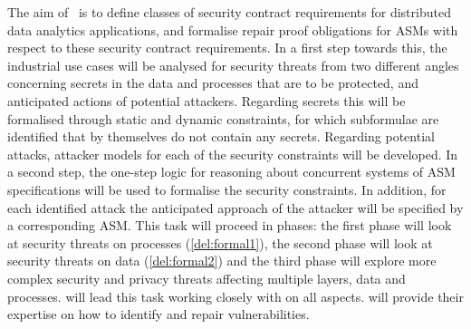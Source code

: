 \begin{Workpackage}{\thewpno}
\begin{Task}
\TaskResults{%
\ref{del:formal1},
\ref{del:formal2},
\ref{del:formal3}
}
\TaskHeader{}

The aim of \theTask\ is to define classes of security contract requirements for distributed data analytics applications, and formalise repair proof obligations for ASMs with respect to these security contract requirements. In a first step towards this, the industrial use cases will be analysed for security threats from two different angles concerning secrets in the data and processes that are to be protected, and anticipated actions of potential attackers. Regarding secrets this will be formalised through static and dynamic constraints, for which subformulae are identified that by themselves do not contain any secrets. Regarding potential attacks, attacker models for each of the security constraints will be developed. In a second step, the one-step logic for reasoning about concurrent systems of ASM specifications will be used to formalise the security constraints. In addition, for each identified attack the anticipated approach of the attacker will be specified by a corresponding ASM. This task will proceed in phases: the first phase will look at security threats on processes (\ref{del:formal1}),
the second phase will look at security threats on data (\ref{del:formal2}) and the third phase will explore
more complex security and privacy threats affecting multiple layers, data and processes.
\SA will lead this task working closely with \SCCHshort on all aspects. \IBMshort will provide their expertise on how to identify and repair vulnerabilities.
\end{Task}


%
%




\end{Workpackage}
